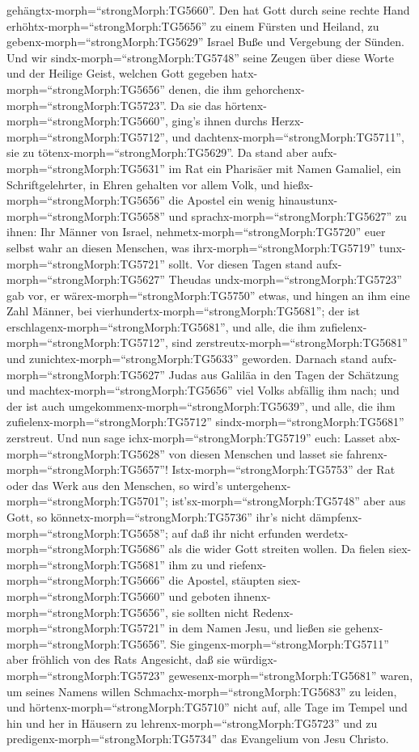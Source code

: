 gehängtx-morph=``strongMorph:TG5660''.  Den hat Gott durch
seine rechte Hand erhöhtx-morph=``strongMorph:TG5656'' zu einem Fürsten
und Heiland, zu gebenx-morph=``strongMorph:TG5629'' Israel Buße und
Vergebung der Sünden.  Und wir
sindx-morph=``strongMorph:TG5748'' seine Zeugen über diese Worte und der
Heilige Geist, welchen Gott gegeben hatx-morph=``strongMorph:TG5656''
denen, die ihm gehorchenx-morph=``strongMorph:TG5723''.  Da
sie das hörtenx-morph=``strongMorph:TG5660'', ging's ihnen durchs
Herzx-morph=``strongMorph:TG5712'', und
dachtenx-morph=``strongMorph:TG5711'', sie zu
tötenx-morph=``strongMorph:TG5629''.  Da stand aber
aufx-morph=``strongMorph:TG5631'' im Rat ein Pharisäer mit Namen
Gamaliel, ein Schriftgelehrter, in Ehren gehalten vor allem Volk, und
hießx-morph=``strongMorph:TG5656'' die Apostel ein wenig
hinaustunx-morph=``strongMorph:TG5658''  und
sprachx-morph=``strongMorph:TG5627'' zu ihnen: Ihr Männer von Israel,
nehmetx-morph=``strongMorph:TG5720'' euer selbst wahr an diesen
Menschen, was ihrx-morph=``strongMorph:TG5719''
tunx-morph=``strongMorph:TG5721'' sollt.  Vor diesen Tagen
stand aufx-morph=``strongMorph:TG5627'' Theudas
undx-morph=``strongMorph:TG5723'' gab vor, er
wärex-morph=``strongMorph:TG5750'' etwas, und hingen an ihm eine Zahl
Männer, bei vierhundertx-morph=``strongMorph:TG5681''; der ist
erschlagenx-morph=``strongMorph:TG5681'', und alle, die ihm
zufielenx-morph=``strongMorph:TG5712'', sind
zerstreutx-morph=``strongMorph:TG5681'' und
zunichtex-morph=``strongMorph:TG5633'' geworden.  Darnach
stand aufx-morph=``strongMorph:TG5627'' Judas aus Galiläa in den Tagen
der Schätzung und machtex-morph=``strongMorph:TG5656'' viel Volks
abfällig ihm nach; und der ist auch
umgekommenx-morph=``strongMorph:TG5639'', und alle, die ihm
zufielenx-morph=``strongMorph:TG5712''
sindx-morph=``strongMorph:TG5681'' zerstreut.  Und nun sage
ichx-morph=``strongMorph:TG5719'' euch: Lasset
abx-morph=``strongMorph:TG5628'' von diesen Menschen und lasset sie
fahrenx-morph=``strongMorph:TG5657''! Istx-morph=``strongMorph:TG5753''
der Rat oder das Werk aus den Menschen, so wird's
untergehenx-morph=``strongMorph:TG5701''; 
ist'sx-morph=``strongMorph:TG5748'' aber aus Gott, so
könnetx-morph=``strongMorph:TG5736'' ihr's nicht
dämpfenx-morph=``strongMorph:TG5658''; auf daß ihr nicht erfunden
werdetx-morph=``strongMorph:TG5686'' als die wider Gott streiten wollen.
 Da fielen siex-morph=``strongMorph:TG5681'' ihm zu und
riefenx-morph=``strongMorph:TG5666'' die Apostel, stäupten
siex-morph=``strongMorph:TG5660'' und geboten
ihnenx-morph=``strongMorph:TG5656'', sie sollten nicht
Redenx-morph=``strongMorph:TG5721'' in dem Namen Jesu, und ließen sie
gehenx-morph=``strongMorph:TG5656''.  Sie
gingenx-morph=``strongMorph:TG5711'' aber fröhlich von des Rats
Angesicht, daß sie würdigx-morph=``strongMorph:TG5723''
gewesenx-morph=``strongMorph:TG5681'' waren, um seines Namens willen
Schmachx-morph=``strongMorph:TG5683'' zu leiden,  und
hörtenx-morph=``strongMorph:TG5710'' nicht auf, alle Tage im Tempel und
hin und her in Häusern zu lehrenx-morph=``strongMorph:TG5723'' und zu
predigenx-morph=``strongMorph:TG5734'' das Evangelium von Jesu Christo.

